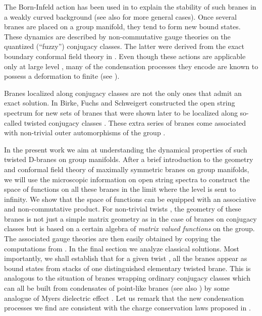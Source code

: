 \documentclass[12pt,a4paper]{article}
\def\id{{\rm id}}
\begin{document}
The Born-Infeld action has been used in \cite{Bachas:2000ik,
Pawelczyk:2000ah} to explain the stability of such branes in 
a weakly curved background (see also \cite{Bordalo:2001ec}
for more general cases). Once several branes are placed on 
a group manifold, they tend to form new bound states. These 
dynamics are described by non-commutative gauge theories on 
the quantized (``fuzzy'') conjugacy classes. The latter were 
derived from the exact boundary conformal field theory in 
\cite{Alekseev:1999bs}. Even though these actions are 
applicable only at large level \coordHE{}, many of the condensation 
processes they encode are known to possess a deformation to 
finite \coordHE{} (see \cite{Alekseev:2000jx,Fredenhagen:2000ei}).     
\medskip
  
Branes localized along conjugacy classes are not the 
only ones that admit an exact solution. In \cite{Birke:1999ik} 
Birke, Fuchs and Schweigert constructed the open string 
spectrum for new sets of branes that were shown later 
to be localized along so-called twisted conjugacy 
classes \cite{Felder:1999ka}. These extra series of branes 
come associated with non-trivial outer automorphisms 
\coordHE{} of the group \coordHE{}. 
\medskip

In the present work we aim at understanding the dynamical 
properties of such twisted D-branes on group manifolds.  
After a brief introduction to the geometry and conformal 
field theory of maximally symmetric branes on group 
manifolds, we will use the microscopic information on 
open string spectra to construct the space of functions 
on all these branes in the limit where the level \coordHE{} is 
sent to infinity. We show that the space of functions 
can be equipped with an associative and non-commutative 
product. For non-trivial twists \myHighlight{$\omega_G \neq \id$}\coordHE{}, the 
geometry of these branes is not just a simple matrix 
geometry as in the case of branes on conjugacy classes
but is based on a certain algebra of {\em matrix valued
functions} on the group.
The associated gauge theories are then easily obtained by 
copying the computations from \cite{Alekseev:1999bs}. In 
the final section we analyze classical solutions. Most 
importantly, we shall establish that for a given 
twist \coordHE{}, all the branes appear as bound 
states from stacks of one distinguished elementary 
twisted brane. This is analogous to the situation of branes 
wrapping ordinary conjugacy classes which can all be 
built from condensates of point-like branes 
\cite{Alekseev:2000fd} (see also \cite{Hashimoto:2001xy,
Hikida:2001py}) by some analogue of Myers dielectric 
effect \cite{Myers:1999ps}. Let us remark 
that the new condensation processes we find are  
consistent with the charge conservation laws  
proposed in \cite{Fredenhagen:2000ei}.  
\end{document}
